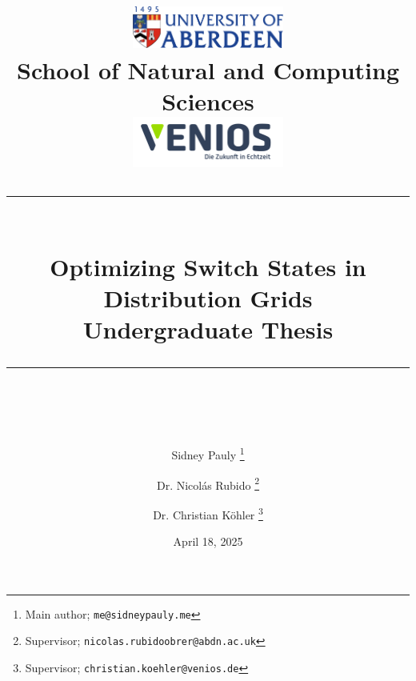 \documentclass[a4paper]{report}
\newcommand{\HRule}[1]{\rule{\linewidth}{#1}}
\begin{document}
\author{Sidney Pauly%
\thanks{Main author; \texttt{me@sidneypauly.me}}\\}

\author{Dr. Nicol\'as Rubido%
\thanks{Supervisor; \texttt{nicolas.rubidoobrer@abdn.ac.uk}}}

\author{Dr. Christian K\"ohler%
\thanks{Supervisor; \texttt{christian.koehler@venios.de}}}

\date{April 18, 2025}



\title{\includegraphics[width=50mm]{img/ABDN.png}\\[.5cm]
		School of Natural and Computing Sciences\\
		\vspace{2.5cm}
		\includegraphics[width=50mm]{img/venios.png}\\[.5cm]
		\HRule{2pt} \\
		\LARGE \textbf{Optimizing Switch States in Distribution Grids}\\
		\vspace{3mm}
		\large Undergraduate Thesis
		\HRule{2pt} \\ [0.5cm]
		}%
		
\maketitle
\end{document}
